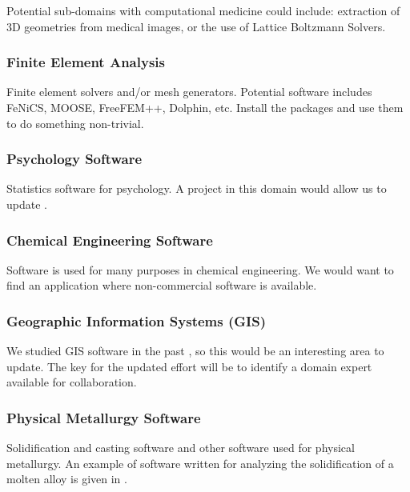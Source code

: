 \documentclass[12pt]{article}
\begin{document}
Potential sub-domains with computational medicine could include: extraction of
3D geometries from medical images, or the use of Lattice Boltzmann
Solvers.  %

\subsubsection{Finite Element Analysis}

Finite element solvers and/or mesh generators.  Potential
software includes FeNiCS, MOOSE, FreeFEM++, Dolphin, etc.  Install the packages
and use them to do something non-trivial.  %

\subsubsection{Psychology Software}

Statistics software for psychology.  A project in this domain would allow us to
update \citet{SmithEtAl2018_StatSoft}. %

\subsubsection{Chemical Engineering Software}

Software is used for many purposes in chemical engineering.  We would want to
find an application where non-commercial software is available.

\subsubsection{Geographic Information Systems (GIS)}

We studied GIS software in the past \citep{SmithEtAl2018_arXivGIS}, so this
would be an interesting area to update.  The key for the updated effort will be
to identify a domain expert available for collaboration. %

\subsubsection{Physical Metallurgy Software}

Solidification and casting software and other software used for physical
metallurgy.  An example of software written for analyzing the solidification of
a molten alloy is given in \citet{SmithEtAl2019_arXiv}.  %
\end{document}
